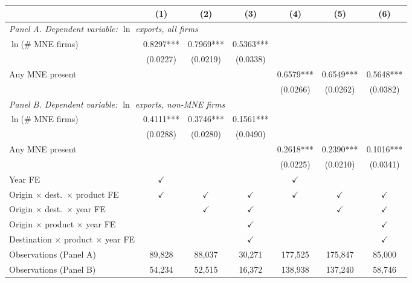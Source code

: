 \begin{tabular}{lcccccc} \hline
 & (1) & (2) & (3) & (4) & (5) & (6) \\ \hline
\multicolumn{7}{l}{\textit{Panel A. Dependent variable: $\ln$ exports, all firms}} \\
$\ln$(\# MNE firms) & 0.8297*** & 0.7969*** & 0.5363*** &  &  &  \\
 & (0.0227) & (0.0219) & (0.0338) &  &  &  \\
Any MNE present &  &  &  & 0.6579*** & 0.6549*** & 0.5648*** \\
 &  &  &  & (0.0266) & (0.0262) & (0.0382) \\
\midrule
\multicolumn{7}{l}{\textit{Panel B. Dependent variable: $\ln$ exports, non-MNE firms}} \\
$\ln$(\# MNE firms) & 0.4111*** & 0.3746*** & 0.1561*** &  &  &  \\
 & (0.0288) & (0.0280) & (0.0490) &  &  &  \\
Any MNE present &  &  &  & 0.2618*** & 0.2390*** & 0.1016*** \\
 &  &  &  & (0.0225) & (0.0210) & (0.0341) \\
\hline
Year FE & $\checkmark$ &  &  & $\checkmark$ &  &  \\
Origin $\times$ dest.\ $\times$ product FE & $\checkmark$ & $\checkmark$ & $\checkmark$ & $\checkmark$ & $\checkmark$ & $\checkmark$ \\
Origin $\times$ dest.\ $\times$ year FE &  & $\checkmark$ & $\checkmark$ &  & $\checkmark$ & $\checkmark$ \\
Origin $\times$ product $\times$ year FE &  &  & $\checkmark$ &  &  & $\checkmark$ \\
Destination $\times$ product $\times$ year FE &  &  & $\checkmark$ &  &  & $\checkmark$ \\
Observations (Panel A) & 89,828 & 88,037 & 30,271 & 177,525 & 175,847 & 85,000 \\
Observations (Panel B) & 54,234 & 52,515 & 16,372 & 138,938 & 137,240 & 58,746 \\
\hline
\end{tabular}
